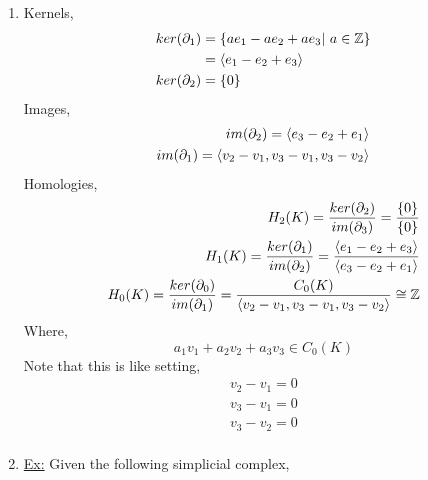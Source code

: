 \documentclass[../notes.tex]{subfiles}
\begin{document}
\begin{enumerate}
    \item
        Kernels,
        \begin{align*}
            ker(\partial_1)&=\{ae_1-ae_2+ae_3|\ a\in \mathbb{Z}\}\\
            &=\langle e_1-e_2+e_3 \rangle\\
            ker(\partial_2)&=\{0\}
        \end{align*}
        Images,
        \begin{align*}
            im(\partial_2)=\langle e_3-e_2+e_1 \rangle\\
            im(\partial_1)=\langle v_2-v_1,v_3-v_1,v_3-v_2 \rangle\\
        \end{align*}
        Homologies,
        \begin{align*}
            H_2(K)=\frac{ker(\partial_2)}{im(\partial_3)}=\frac{\{0\}}{\{0\}}\\
            H_1(K)=\frac{ker(\partial_1)}{im(\partial_2)}=
            \frac{\langle e_1-e_2+e_3 \rangle}{\langle e_3-e_2+e_1 \rangle}\\
            H_0(K)=\frac{ker(\partial_0)}{im(\partial_1)}=
            \frac{C_0(K)}{\langle v_2-v_1,v_3-v_1,v_3-v_2 \rangle}\cong \mathbb{Z}\\
        \end{align*}
        Where,
        \[
            a_1v_1+a_2v_2+a_3v_3\in C_0(K)
        \]
        Note that this is like setting,
        \begin{align*}
            v_2-v_1=0\\
            v_3-v_1=0\\
            v_3-v_2=0\\
        \end{align*}
    \item \underline{Ex:} Given the following simplicial complex,
        \begin{center}
        \end{center}

\end{enumerate}
\end{document}
